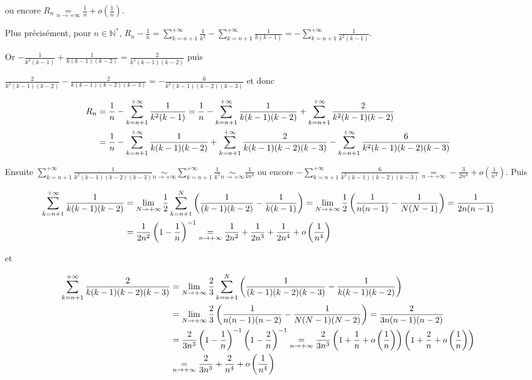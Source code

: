 \documentclass[11pt,a4paper]{article}
\newcommand{\Nn}{\mathbb{N}} \newcommand{\N}{\mathbb{N}}
\begin{document}
ou encore $R_n\underset{n\rightarrow+\infty}{=}\frac{1}{n}+o\left(\frac{1}{n}\right)$.

Plus précisément, pour $n\in\Nn^*$, $R_n-\frac{1}{n}=\sum_{k=n+1}^{+\infty}\frac{1}{k^2}-\sum_{k=n+1}^{+\infty}\frac{1}{k(k-1)}=-\sum_{k=n+1}^{+\infty}\frac{1}{k^2(k-1)}$.

Or $-\frac{1}{k^2(k-1)}+\frac{1}{k(k-1)(k-2)}=\frac{2}{k^2(k-1)(k-2)}$ puis

$\frac{2}{k^2(k-1)(k-2)}-\frac{2}{k(k-1)(k-2)(k-3)}=-\frac{6}{k^2(k-1)(k-2)(k-3)}$ et donc

\begin{align*}\ensuremath
R_n&=\frac{1}{n}-\sum_{k=n+1}^{+\infty}\frac{1}{k^2(k-1)}=\frac{1}{n}-\sum_{k=n+1}^{+\infty}\frac{1}{k(k-1)(k-2)}+\sum_{k=n+1}^{+\infty}\frac{2}{k^2(k-1)(k-2)}\\
 &=\frac{1}{n}-\sum_{k=n+1}^{+\infty}\frac{1}{k(k-1)(k-2)}+\sum_{k=n+1}^{+\infty}\frac{2}{k(k-1)(k-2)(k-3)}-\sum_{k=n+1}^{+\infty}\frac{6}{k^2(k-1)(k-2)(k-3)}
\end{align*}

Ensuite  $\sum_{k=n+1}^{+\infty}\frac{1}{k^2(k-1)(k-2)(k-3)}\underset{n\rightarrow+\infty}{\sim}\sum_{k=n+1}^{+\infty}\frac{1}{k^5}\underset{n\rightarrow+\infty}{\sim}\frac{1}{4n^4}$ ou encore $-\sum_{k=n+1}^{+\infty}\frac{6}{k^2(k-1)(k-2)(k-3)}\underset{n\rightarrow+\infty}{=}-\frac{3}{2n^4}+o\left(\frac{1}{n^4}\right)$. Puis

\begin{align*}\ensuremath
\sum_{k=n+1}^{+\infty}\frac{1}{k(k-1)(k-2)}&=\lim_{N \rightarrow +\infty}\frac{1}{2}\sum_{k=n+1}^{N}\left(\frac{1}{(k-1)(k-2)}-\frac{1}{k(k-1)}\right)=\lim_{N \rightarrow +\infty}\frac{1}{2}\left(\frac{1}{n(n-1)}-\frac{1}{N(N-1)}\right)=\frac{1}{2n(n-1)}\\
 &=\frac{1}{2n^2}\left(1-\frac{1}{n}\right)^{-1}\underset{n\rightarrow+\infty}{=}\frac{1}{2n^2}+\frac{1}{2n^3}+\frac{1}{2n^4}+o\left(\frac{1}{n^4}\right)
\end{align*}

et

\begin{align*}\ensuremath
\sum_{k=n+1}^{+\infty}\frac{2}{k(k-1)(k-2)(k-3)}&=\lim_{N \rightarrow +\infty}\frac{2}{3}\sum_{k=n+1}^{N}\left(\frac{1}{(k-1)(k-2)(k-3)}-\frac{1}{k(k-1)(k-2)}\right)\\
 &=\lim_{N \rightarrow +\infty}\frac{2}{3}\left(\frac{1}{n(n-1)(n-2)}-\frac{1}{N(N-1)(N-2)}\right)=\frac{2}{3n(n-1)(n-2)}\\
 &=\frac{2}{3n^3}\left(1-\frac{1}{n}\right)^{-1}\left(1-\frac{2}{n}\right)^{-1}\underset{n\rightarrow+\infty}{=}\frac{2}{3n^3}\left(1+\frac{1}{n}+o\left(\frac{1}{n}\right)\right)\left(1+\frac{2}{n}+o\left(\frac{1}{n}\right)\right)\\
  &\underset{n\rightarrow+\infty}{=}\frac{2}{3n^3}+\frac{2}{n^4}+o\left(\frac{1}{n^4}\right)
\end{align*}
\end{document}
